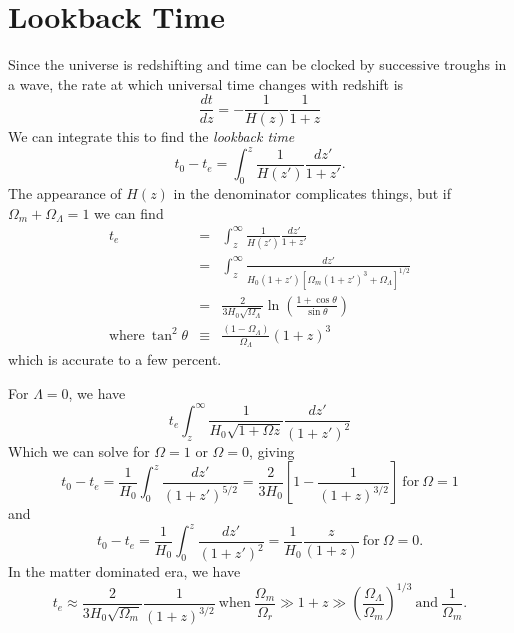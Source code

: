\documentclass[]{article}
\begin{document}
\section{Lookback Time}
Since the universe is redshifting and time can be clocked by
successive troughs in a wave, the rate at which universal
time changes with redshift is
\begin{equation}
\frac{dt}{dz} = - \frac{1}{H(z)}\frac{1}{1+z}
\end{equation}
\noindent
We can integrate this to find the {\it lookback time}
\begin{equation}
t_0 - t_e = \int_{0}^{z} \frac{1}{H(z')}\frac{dz'}{1+z'}.
\end{equation}
\noindent
The appearance of $H(z)$ in the denominator complicates things,
but if $\Omega_m + \Omega_\Lambda = 1$ we can find
\begin{eqnarray}
t_e &=& \int_z^{\infty}\frac{1}{H(z')}\frac{dz'}{1+z'} \nonumber\\
&=&\int_z^{\infty} \frac{dz'}{H_0(1+z')[\Omega_m(1+z')^3 + \Omega_\Lambda]^{1/2}}\nonumber\\
&=&\frac{2}{3 H_0\sqrt{\Omega_\Lambda}}\ln\left(\frac{1+\cos\theta}{\sin\theta}\right)\nonumber\\
\mathrm{where}~\tan^{2}\theta&\equiv&\frac{(1-\Omega_\Lambda)}{\Omega_\Lambda}(1+z)^3
\end{eqnarray}
\noindent
which is accurate to a few percent.

For $\Lambda=0$, we have
\begin{equation}
t_e \int_z^\infty \frac{1}{H_0\sqrt{1+\Omega z}}\frac{dz'}{(1+z')^2}
\end{equation}
\noindent
Which we can solve for $\Omega=1$ or $\Omega=0$, giving
\begin{equation}
t_0 - t_e = \frac{1}{H_0}\int_0^z \frac{dz'}{(1+z')^{5/2}} = \frac{2}{3H_0}\left[1-\frac{1}{(1+z)^{3/2}}\right]~\mathrm{for}~\Omega = 1
\end{equation}
\noindent
and
\begin{equation}
t_0 - t_e = \frac{1}{H_0}\int_0^z \frac{dz'}{(1+z')^{2}} = \frac{1}{H_0}\frac{z}{(1+z)}~\mathrm{for}~\Omega = 0.
\end{equation}
\noindent
In the matter dominated era, we have
\begin{equation}
t_e \approx \frac{2}{3H_0\sqrt{\Omega_m}}\frac{1}{(1+z)^{3/2}}~\mathrm{when}~\frac{\Omega_m}{\Omega_r}\gg1+z \gg \left(\frac{\Omega_{\Lambda}}{\Omega_m}\right)^{1/3}~\mathrm{and}~\frac{1}{\Omega_m}.
\end{equation}
\end{document}
